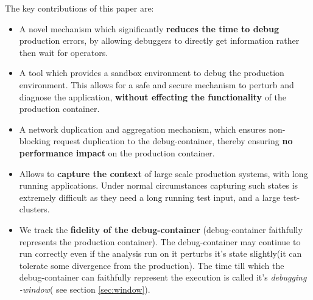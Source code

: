 \noindent
The key contributions of this paper are:
\begin{itemize}[leftmargin=*,topsep=0pt,itemsep=-1ex,partopsep=1ex,parsep=1ex]
\item A novel mechanism which significantly \textbf{reduces the time to debug} production errors, by allowing debuggers to directly get information rather then wait for operators.
\item A tool which provides a sandbox environment to debug the production environment. 
This allows for a safe and secure mechanism to perturb and diagnose the application, \textbf{without effecting the functionality} of the  production container.
\item A network duplication and aggregation mechanism, which ensures non-blocking request duplication to the debug-container, thereby ensuring \textbf{no performance impact} on the production container. 
\item Allows to \textbf{capture the context} of large scale production systems, with long running applications. Under normal circumstances capturing such states is extremely difficult as they need a long running test input, and a
  large test-clusters.
\item We track the \textbf{fidelity of the debug-container} (debug-container faithfully represents the production container). 
The debug-container may continue to run correctly even if the analysis run on it perturbs it's state slightly(it can tolerate some divergence from the production).
The time till which the debug-container can faithfully represent the execution is called it's \emph{debugging -window}( see section \ref{sec:window}).


\end{itemize}

